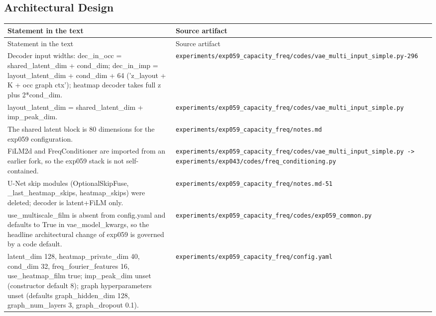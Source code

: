 \subsection*{Architectural Design}
\begingroup\small
\begin{longtable}{p{} p{}}
\hline
Statement in the text & Source artifact \\
\hline
\endfirsthead
\hline
Statement in the text & Source artifact \\
\hline
\endhead
Decoder input widths: dec\_in\_occ = shared\_latent\_dim + cond\_dim; dec\_in\_imp = layout\_latent\_dim + cond\_dim + 64 ('z\_layout + K + occ graph ctx'); heatmap decoder takes full z plus 2*cond\_dim. & \texttt{experiments/\allowbreak{}exp059\_\allowbreak{}capacity\_\allowbreak{}freq/\allowbreak{}codes/\allowbreak{}vae\_\allowbreak{}multi\_\allowbreak{}input\_\allowbreak{}simple.py-296} \\
layout\_latent\_dim = shared\_latent\_dim + imp\_peak\_dim. & \texttt{experiments/\allowbreak{}exp059\_\allowbreak{}capacity\_\allowbreak{}freq/\allowbreak{}codes/\allowbreak{}vae\_\allowbreak{}multi\_\allowbreak{}input\_\allowbreak{}simple.py} \\
The shared latent block is 80 dimensions for the exp059 configuration. & \texttt{experiments/\allowbreak{}exp059\_\allowbreak{}capacity\_\allowbreak{}freq/\allowbreak{}notes.md} \\
FiLM2d and FreqConditioner are imported from an earlier fork, so the exp059 stack is not self-contained. & \texttt{experiments/\allowbreak{}exp059\_\allowbreak{}capacity\_\allowbreak{}freq/\allowbreak{}codes/\allowbreak{}vae\_\allowbreak{}multi\_\allowbreak{}input\_\allowbreak{}simple.py -> experiments/\allowbreak{}exp043/\allowbreak{}codes/\allowbreak{}freq\_\allowbreak{}conditioning.py} \\
U-Net skip modules (OptionalSkipFuse, \_last\_heatmap\_skips, heatmap\_skips) were deleted; decoder is latent+FiLM only. & \texttt{experiments/\allowbreak{}exp059\_\allowbreak{}capacity\_\allowbreak{}freq/\allowbreak{}notes.md-51} \\
use\_multiscale\_film is absent from config.yaml and defaults to True in vae\_model\_kwargs, so the headline architectural change of exp059 is governed by a code default. & \texttt{experiments/\allowbreak{}exp059\_\allowbreak{}capacity\_\allowbreak{}freq/\allowbreak{}codes/\allowbreak{}exp059\_\allowbreak{}common.py} \\
latent\_dim 128, heatmap\_private\_dim 40, cond\_dim 32, freq\_fourier\_features 16, use\_heatmap\_film true; imp\_peak\_dim unset (constructor default 8); graph hyperparameters unset (defaults graph\_hidden\_dim 128, graph\_num\_layers 3, graph\_dropout 0.1). & \texttt{experiments/\allowbreak{}exp059\_\allowbreak{}capacity\_\allowbreak{}freq/\allowbreak{}config.yaml} \\

\end{longtable}
